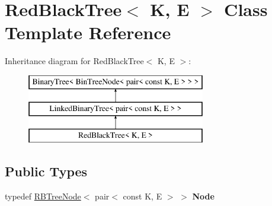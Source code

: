 \hypertarget{classRedBlackTree}{}\section{Red\+Black\+Tree$<$ K, E $>$ Class Template Reference}
\label{classRedBlackTree}
Inheritance diagram for Red\+Black\+Tree$<$ K, E $>$\+:\begin{figure}[H]
\begin{center}
\leavevmode
\includegraphics[height=3.000000cm]{classRedBlackTree}
\end{center}
\end{figure}
\subsection*{Public Types}
\begin{DoxyCompactItemize}
\item 
\mbox{\label{classRedBlackTree_aa066ea6a55f097b0ddc01f92217ca4b3}} 
typedef \hyperlink{structRBTreeNode}{R\+B\+Tree\+Node}$<$ pair$<$ const K, E $>$ $>$ {\bfseries Node}
\end{DoxyCompactItemize}
